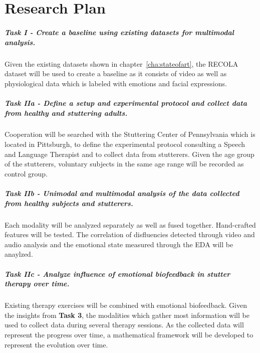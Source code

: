 \chapter{Research Plan}
\label{cha:plan}
\acresetall

\paragraph{Task I - Create a baseline using existing datasets for multimodal analysis.}
Given the existing datasets shown in chapter~\ref{cha:stateofart}, the RECOLA dataset will be used to create a baseline as it consists of video as well as physiological data which is labeled with emotions and facial expressions.

\paragraph{Task IIa - Define a setup and experimental protocol and collect data from healthy and stuttering adults.}
Cooperation will be searched with the Stuttering Center of Pennsylvania which is located in Pittsburgh, to define the experimental protocol consulting a Speech and Language Therapist and to collect data from stutterers. Given the age group of the stutterers, voluntary subjects in the same age range will be recorded as control group.

\paragraph{Task IIb - Unimodal and multimodal analysis of the data collected from healthy subjects and stutterers.} Each modality will be analyzed separately as well as fused together. Hand-crafted features will be tested. The correlation of disfluencies detected through video and audio analysis and the emotional state measured through the EDA will be anaylzed.

\paragraph{Task IIc - Analyze influence of emotional biofeedback in stutter therapy over time.} Existing therapy exercises will be combined with emotional biofeedback. Given the insights from \textbf{Task 3}, the modalities which gather most information   will be used to collect data during several therapy sessions. As the collected data will represent the progress over time, a mathematical framework will be developed to represent the evolution over time.


